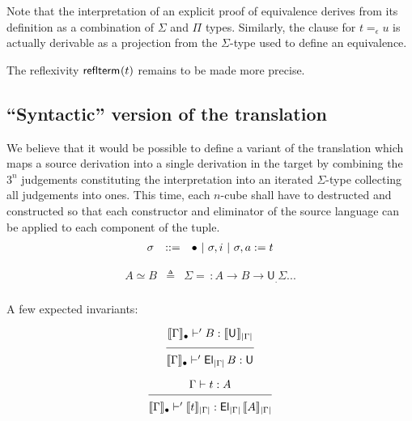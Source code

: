 \documentclass{article}
\newcommand{\sort}[1]{\mathsf{U}_{#1}}
\newcommand{\defeq}{\triangleq}
\begin{document}
Note that the interpretation of an explicit proof of equivalence
derives from its definition as a combination of $\Sigma$ and $\Pi$
types. Similarly, the clause for $t =_\epsilon u$ is actually derivable
as a projection from the $\Sigma$-type used to define an equivalence.

The reflexivity $\mathsf{reflterm}_{}(t)$ remains to be made more precise.
 
\subsection{``Syntactic'' version of the translation}

We believe that it would be possible to define a variant of the
translation which maps a source derivation into a single derivation in
the target by combining the $3^n$ judgements constituting the
interpretation into an iterated $\Sigma$-type collecting all
judgements into ones. This time, each $n$-cube shall have to
destructed and constructed so that each constructor and eliminator of
the source language can be applied to each component of the tuple.
\fi %
\iffalse
$$
\begin{array}{lcl}
\sigma & ::= & \bullet ~|~ \sigma, i ~|~ \sigma, a:=t\\
\end{array}
$$

$$
\begin{array}{lcl}
A \simeq B & \defeq & \Sigma =\, : A \rightarrow B \rightarrow \sort. \Sigma ...\\
\end{array}
$$

A few expected invariants:

$$
\seq{\semctx{\emptysigma}{\Gamma} \vdash' B : \semnew{|\Gamma|}{\sort{}}}
    {\semctx{\emptysigma}{\Gamma} \vdash' \elt{|\Gamma|}{B} : \sort{}}
$$

$$
\seq{\Gamma \vdash t : A}
    {\semctx{\emptysigma}{\Gamma} \vdash' \semnew{|\Gamma|}{t} : \elt{|\Gamma|}{\semnew{|\Gamma|}{A}}}
$$
\end{document}
